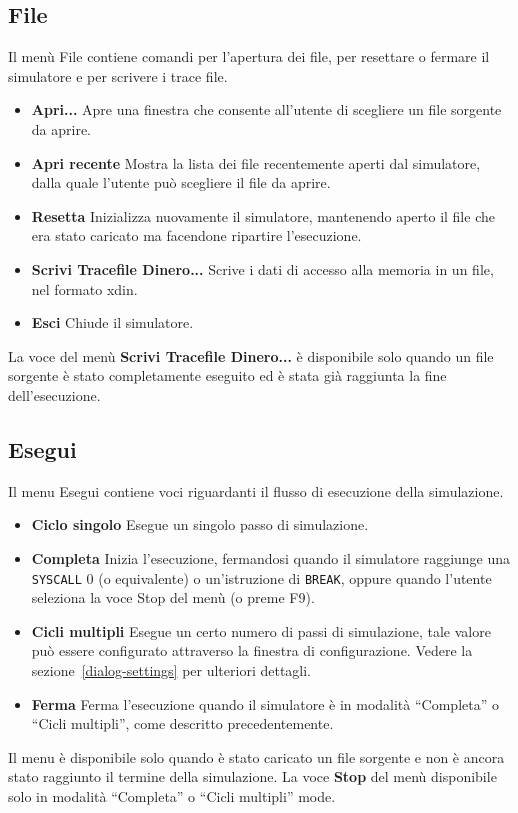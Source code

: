 \documentclass[12pt]{report}
\newcommand{\EM}{EduMIPS64}
\newcommand{\SC}{\texttt{SYSCALL}}
\begin{document}
\subsection{File}
Il men\`{u} File contiene comandi per l'apertura dei file, per resettare o fermare il simulatore e per scrivere i trace file.
\begin{itemize}
	\item \textbf{Apri...} Apre una finestra che consente all'utente di scegliere un file sorgente da aprire.
	\item \textbf{Apri recente} Mostra la lista dei file recentemente aperti dal simulatore, dalla quale l'utente pu\`{o} scegliere il file da aprire.
	\item \textbf{Resetta} Inizializza nuovamente il simulatore, mantenendo aperto il file che era stato caricato ma facendone ripartire l'esecuzione.
	\item \textbf{Scrivi Tracefile Dinero...} Scrive i dati di accesso alla memoria in un file, nel formato xdin.
	\item \textbf{Esci} Chiude il simulatore.
\end{itemize}
La voce del men\`{u} \textbf{Scrivi Tracefile Dinero...} \`{e} disponibile solo quando un file sorgente \`{e} 
stato completamente eseguito ed \`{e} stata gi\`{a} raggiunta la fine dell'esecuzione.


\index{\EM{}!menu!Esegui}
\subsection{Esegui}
Il menu Esegui contiene voci riguardanti il flusso di esecuzione della simulazione.
\begin{itemize}
	\item \textbf{Ciclo singolo} Esegue un singolo passo di simulazione.
	\item \textbf{Completa} Inizia l'esecuzione, fermandosi quando il simulatore raggiunge una \SC{} 0 (o equivalente) o
	un'istruzione di \texttt{BREAK}, oppure quando l'utente seleziona la voce Stop del men\`{u} (o preme F9).  
	\item \textbf{Cicli multipli} Esegue un certo numero di passi di
    simulazione, tale valore pu\`o essere configurato 
	attraverso la finestra di configurazione. Vedere la sezione~\ref{dialog-settings} per ulteriori dettagli.
	\item \textbf{Ferma} Ferma l'esecuzione quando il simulatore \`{e} in
    modalit\`{a} ``Completa'' o ``Cicli multipli'', come descritto precedentemente.
\end{itemize}
Il menu \`{e} disponibile solo quando \`{e} stato caricato un file sorgente e non \`{e} ancora stato raggiunto il termine della simulazione.
La voce \textbf{Stop} del men\`{u}  disponibile solo in modalit\`{a} ``Completa'' o ``Cicli multipli'' mode.
\end{document}
